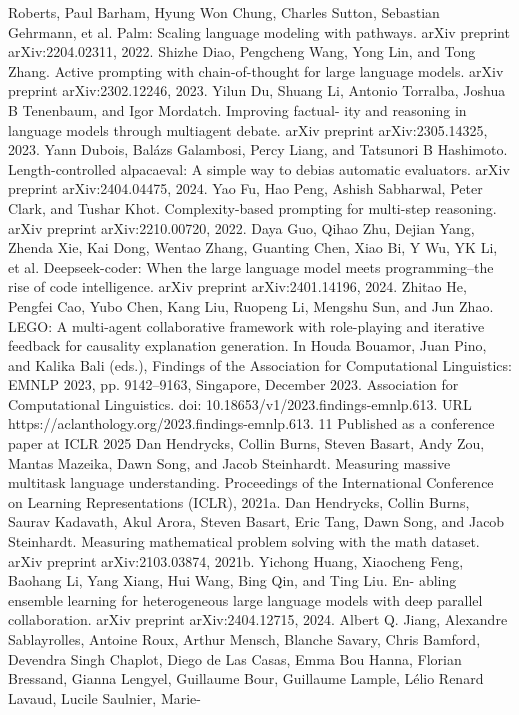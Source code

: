 Roberts, Paul Barham, Hyung Won Chung, Charles Sutton, Sebastian Gehrmann, et al. Palm:
Scaling language modeling with pathways. arXiv preprint arXiv:2204.02311, 2022.
Shizhe Diao, Pengcheng Wang, Yong Lin, and Tong Zhang. Active prompting with chain-of-thought
for large language models. arXiv preprint arXiv:2302.12246, 2023.
Yilun Du, Shuang Li, Antonio Torralba, Joshua B Tenenbaum, and Igor Mordatch. Improving factual-
ity and reasoning in language models through multiagent debate. arXiv preprint arXiv:2305.14325,
2023.
Yann Dubois, Balázs Galambosi, Percy Liang, and Tatsunori B Hashimoto. Length-controlled
alpacaeval: A simple way to debias automatic evaluators. arXiv preprint arXiv:2404.04475, 2024.
Yao Fu, Hao Peng, Ashish Sabharwal, Peter Clark, and Tushar Khot. Complexity-based prompting
for multi-step reasoning. arXiv preprint arXiv:2210.00720, 2022.
Daya Guo, Qihao Zhu, Dejian Yang, Zhenda Xie, Kai Dong, Wentao Zhang, Guanting Chen, Xiao
Bi, Y Wu, YK Li, et al. Deepseek-coder: When the large language model meets programming–the
rise of code intelligence. arXiv preprint arXiv:2401.14196, 2024.
Zhitao He, Pengfei Cao, Yubo Chen, Kang Liu, Ruopeng Li, Mengshu Sun, and Jun Zhao. LEGO:
A multi-agent collaborative framework with role-playing and iterative feedback for causality
explanation generation. In Houda Bouamor, Juan Pino, and Kalika Bali (eds.), Findings of the
Association for Computational Linguistics: EMNLP 2023, pp. 9142–9163, Singapore, December
2023. Association for Computational Linguistics. doi: 10.18653/v1/2023.findings-emnlp.613.
URL https://aclanthology.org/2023.findings-emnlp.613.
11
Published as a conference paper at ICLR 2025
Dan Hendrycks, Collin Burns, Steven Basart, Andy Zou, Mantas Mazeika, Dawn Song, and Jacob
Steinhardt. Measuring massive multitask language understanding. Proceedings of the International
Conference on Learning Representations (ICLR), 2021a.
Dan Hendrycks, Collin Burns, Saurav Kadavath, Akul Arora, Steven Basart, Eric Tang, Dawn Song,
and Jacob Steinhardt. Measuring mathematical problem solving with the math dataset. arXiv
preprint arXiv:2103.03874, 2021b.
Yichong Huang, Xiaocheng Feng, Baohang Li, Yang Xiang, Hui Wang, Bing Qin, and Ting Liu. En-
abling ensemble learning for heterogeneous large language models with deep parallel collaboration.
arXiv preprint arXiv:2404.12715, 2024.
Albert Q. Jiang, Alexandre Sablayrolles, Antoine Roux, Arthur Mensch, Blanche Savary, Chris
Bamford, Devendra Singh Chaplot, Diego de Las Casas, Emma Bou Hanna, Florian Bressand,
Gianna Lengyel, Guillaume Bour, Guillaume Lample, Lélio Renard Lavaud, Lucile Saulnier, Marie-
